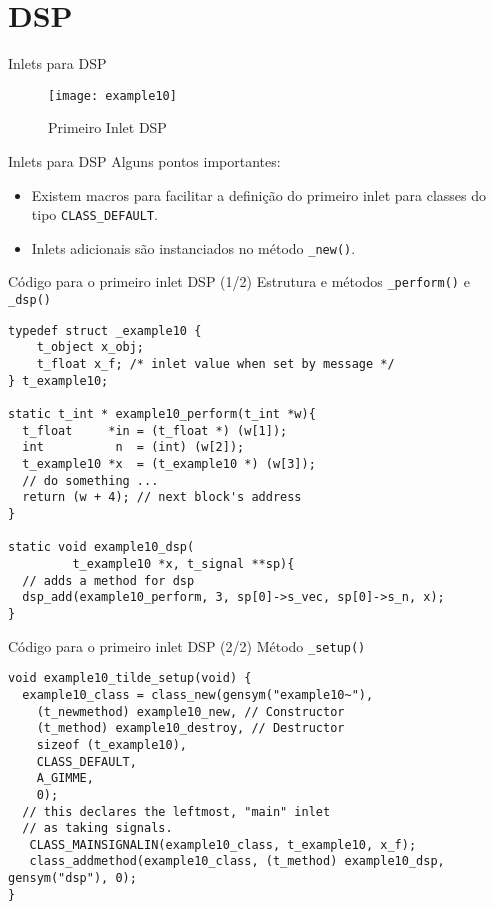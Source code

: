 \section{DSP}

\begin{frame}{Inlets para DSP}
\begin{figure}[h!]
\centering
\texttt{[image: example10]}
\caption{Primeiro Inlet DSP}
\end{figure}
\end{frame}


\begin{frame}{Inlets para DSP}
Alguns pontos importantes:
\begin{itemize}
\item Existem macros para facilitar a definição do primeiro inlet para classes
do tipo \texttt{CLASS\_DEFAULT}.
\item Inlets adicionais são instanciados no método \texttt{\_new()}.
\end{itemize}
\end{frame}


\begin{frame}[fragile]{Código para o primeiro inlet DSP (1/2)}
{Estrutura e métodos \texttt{\_perform()} e \texttt{\_dsp()}}

\begin{lstlisting}
typedef struct _example10 {
    t_object x_obj;
    t_float x_f; /* inlet value when set by message */
} t_example10;

static t_int * example10_perform(t_int *w){
  t_float     *in = (t_float *) (w[1]);
  int          n  = (int) (w[2]);
  t_example10 *x  = (t_example10 *) (w[3]);
  // do something ...
  return (w + 4); // next block's address
}

static void example10_dsp(
         t_example10 *x, t_signal **sp){
  // adds a method for dsp
  dsp_add(example10_perform, 3, sp[0]->s_vec, sp[0]->s_n, x);
}
\end{lstlisting}

\end{frame}


\begin{frame}[fragile]{Código para o primeiro inlet DSP (2/2)}
{Método \texttt{\_setup()}}
\begin{lstlisting}
void example10_tilde_setup(void) {
  example10_class = class_new(gensym("example10~"),
    (t_newmethod) example10_new, // Constructor
    (t_method) example10_destroy, // Destructor
    sizeof (t_example10),
    CLASS_DEFAULT,
    A_GIMME,
    0);
  // this declares the leftmost, "main" inlet
  // as taking signals.
   CLASS_MAINSIGNALIN(example10_class, t_example10, x_f);
   class_addmethod(example10_class, (t_method) example10_dsp, gensym("dsp"), 0);
}
\end{lstlisting}

\end{frame}


